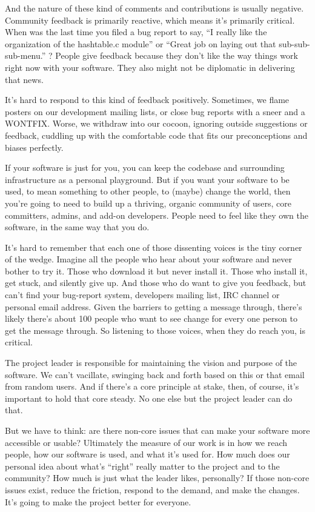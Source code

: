 And the nature of these kind of comments and contributions is usually negative. Community feedback is primarily reactive, which means it's primarily critical. When was the last time you filed a bug report to say, “I really like the organization of the hashtable.c module” or “Great job on laying out that sub-sub-sub-menu.” ? People give feedback because they don't like the way things work right now with your software. They also might not be diplomatic in delivering that news.

It's hard to respond to this kind of feedback positively. Sometimes, we flame posters on our development mailing lists, or close bug reports with a sneer and a WONTFIX. Worse, we withdraw into our cocoon, ignoring outside suggestions or feedback, cuddling up with the comfortable code that fits our preconceptions and biases perfectly.

If your software is just for you, you can keep the codebase and surrounding infrastructure as a personal playground. But if you want your software to be used, to mean something to other people, to (maybe) change the world, then you're going to need to build up a thriving, organic community of users, core committers, admins, and add-on developers. People need to feel like they own the software, in the same way that you do.

It's hard to remember that each one of those dissenting voices is the tiny corner of the wedge. Imagine all the people who hear about your software and never bother to try it. Those who download it but never install it. Those who install it, get stuck, and silently give up. And those who do want to give you feedback, but can't find your bug-report system, developers mailing list, IRC channel or personal email address. Given the barriers to getting a message through, there's likely there's about 100 people who want to see change for every one person to get the message through. So listening to those voices, when they do reach you, is critical.

The project leader is responsible for maintaining the vision and purpose of the software. We can't vacillate, swinging back and forth based on this or that email from random users. And if there's a core principle at stake, then, of course, it's important to hold that core steady. No one else but the project leader can do that.

But we have to think: are there non-core issues that can make your software more accessible or usable?
Ultimately the measure of our work is in how we reach people, how our software is used, and what it's used for. How much does our personal idea about what's “right” really matter to the project and to the community? How much is just what the leader likes, personally? If those non-core issues exist, reduce the friction, respond to the demand, and make the changes. It's going to make the project better for everyone.
